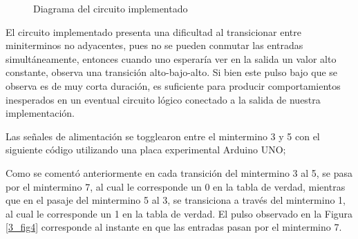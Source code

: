 \newcommand{\myboxi}
{%
    \begin{figure}
\begin{center}
\resizebox{.5\linewidth}{!}{\parbox{\linewidth}{}}
\caption{Diagrama del circuito implementado} 
\label{3_fig3}
\end{center}
    \end{figure}\par\noindent
}

\myboxi
El circuito implementado presenta una dificultad al transicionar entre miniterminos no adyacentes, pues no se pueden conmutar las entradas simultáneamente, entonces cuando uno esperaría ver en la salida un valor alto constante, observa una transición alto-bajo-alto. Si bien este pulso bajo que se observa es de muy corta duración, es suficiente para producir comportamientos inesperados en un eventual circuito lógico conectado a la salida de nuestra implementación. 


Las señales de alimentación se togglearon entre el mintermino 3 y 5 con el siguiente código utilizando una placa experimental Arduino UNO;



%

Como se comentó anteriormente en cada transición del mintermino 3 al 5, se pasa por el mintermino 7, al cual le corresponde un 0 en la tabla de verdad, mientras que en el pasaje del mintermino 5 al 3, se transiciona a través del mintermino 1, al cual le corresponde un 1 en la tabla de verdad. El pulso observado en la Figura \ref{3_fig4} corresponde al instante en que las entradas pasan por el mintermino 7.



